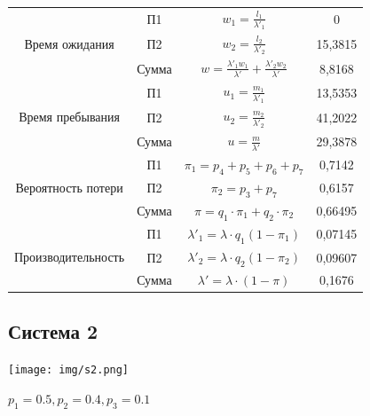 \begin{tabular}{|c|c|c|c|}
\multirow{3}{*}{Время ожидания}     & П1     & $w_1=\frac{l_1}{\lambda'_1}$                                            & 0        \\ \cline{2-4}
                                    & П2     & $w_2=\frac{l_2}{\lambda'_2}$                                            & 15,3815  \\ \cline{2-4}
                                    & Сумма  & $w = \frac{\lambda'_1 w_1}{\lambda'} + \frac{\lambda'_2 w_2}{\lambda'}$ & 8,8168   \\ \hline
\multirow{3}{*}{Время пребывания}   & П1     & $u_1 = \frac{m_1}{\lambda'_1}$                                          & 13,5353  \\ \cline{2-4}
                                    & П2     & $u_2 = \frac{m_2}{\lambda'_2}$                                          & 41,2022  \\ \cline{2-4}
                                    & Сумма  & $u = \frac{m}{\lambda'}$                                                & 29,3878  \\ \hline
\multirow{3}{*}{Вероятность потери} & П1     & $\pi_1 = p_4 + p_5 + p_6 + p_7$                                         & 0,7142   \\ \cline{2-4}
                                    & П2     & $\pi_2 = p_3 + p_7$                                                     & 0,6157   \\ \cline{2-4}
                                    & Сумма  & $\pi = q_1 \cdot \pi_1 + q_2 \cdot \pi_2$                               & 0,66495  \\ \hline
\multirow{3}{*}{Производительность} & П1     & $\lambda'_1 = \lambda \cdot q_1(1 - \pi_1)$                             & 0,07145  \\ \cline{2-4}
                                    & П2     & $\lambda'_2 = \lambda \cdot q_2(1 - \pi_2)$                             & 0,09607  \\ \cline{2-4}
                                    & Сумма  & $\lambda' = \lambda \cdot (1 - \pi)$                                    & 0,1676   \\ \hline
\end{tabular}

\newpage
\subsection{Система 2}
\texttt{[image: img/s2.png]}

$p_1 = 0.5, p_2 = 0.4, p_3 = 0.1$\\

